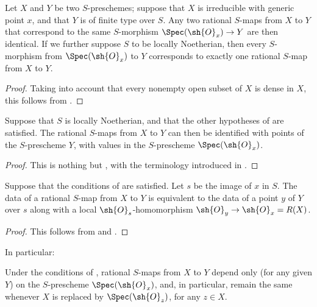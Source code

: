 \begin{proposition}[7.1.11]
\label{I.7.1.11}
Let $X$ and $Y$ be two $S$-preschemes; suppose that $X$ is irreducible with generic point $x$, and that $Y$ is of finite type over $S$.
Any two rational $S$-maps from $X$ to $Y$ that correspond to the same $S$-morphism $\Spec(\sh{O}_x)\to Y$ are then identical.
If we further suppose $S$ to be locally Noetherian, then every $S$-morphism from $\Spec(\sh{O}_x)$ to $Y$ corresponds to exactly one rational $S$-map from $X$ to $Y$.
\end{proposition}

\begin{proof}
Taking into account that every nonempty open subset of $X$ is dense in $X$, this follows from .
\end{proof}

\begin{corollary}[7.1.12]
\label{I.7.1.12}
Suppose that $S$ is locally Noetherian, and that the other hypotheses of  are satisfied.
The rational $S$-maps from $X$ to $Y$ can then be identified with points of the $S$-prescheme $Y$, with values in the $S$-prescheme $\Spec(\sh{O}_x)$.
\end{corollary}

\begin{proof}
This is nothing but , with the terminology introduced in .
\end{proof}

\begin{corollary}[7.1.13]
\label{I.7.1.13}
Suppose that the conditions of  are satisfied.
Let $s$ be the image of $x$ in $S$.
The data of a rational $S$-map from $X$ to $Y$ is equivalent to the data of a point $y$ of $Y$ over $s$ along with a local $\sh{O}_s$-homomorphism $\sh{O}_y\to\sh{O}_x=R(X)$.
\end{corollary}

\begin{proof}
This follows from  and .
\end{proof}

In particular:
\begin{corollary}[7.1.14]
\label{I.7.1.14}
Under the conditions of , rational $S$-maps from $X$ to $Y$ depend only (for any given $Y$) on the $S$-prescheme $\Spec(\sh{O}_x)$, and, in particular, remain the same whenever $X$ is replaced by $\Spec(\sh{O}_z)$, for any $z\in X$.
\end{corollary}

